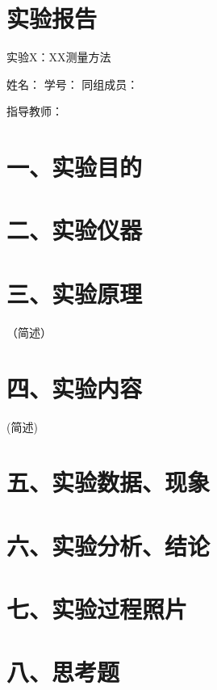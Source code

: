 \documentclass[
  10
]{article}
\author{}
\date{}
\begin{document}
\section{实验报告}\label{ux5b9eux9a8cux62a5ux544a}

实验X：XX测量方法

姓名： 学号： 同组成员：

指导教师：

\section{一、实验目的}\label{ux4e00ux5b9eux9a8cux76eeux7684}

\section{二、实验仪器}\label{ux4e8cux5b9eux9a8cux4eeaux5668}

\section{三、实验原理}\label{ux4e09ux5b9eux9a8cux539fux7406}

（简述）

\section{四、实验内容}\label{ux56dbux5b9eux9a8cux5185ux5bb9}

(简述)

\section{五、实验数据、现象}\label{ux4e94ux5b9eux9a8cux6570ux636eux73b0ux8c61}

\section{六、实验分析、结论}\label{ux516dux5b9eux9a8cux5206ux6790ux7ed3ux8bba}

\section{七、实验过程照片}\label{ux4e03ux5b9eux9a8cux8fc7ux7a0bux7167ux7247}

\section{八、思考题}\label{ux516bux601dux8003ux9898}
\end{document}

